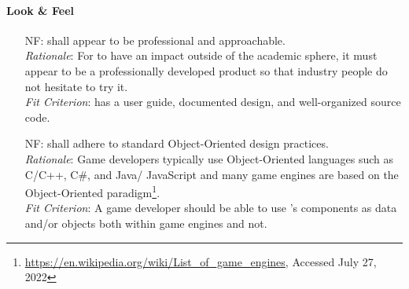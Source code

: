 \paragraph{Look \& Feel}
\noindent \begin{itemize}[wide=0pt, leftmargin=*]

    \item[NF\refstepcounter{nfnum}\thenfnum \label{N_Professional}:]
    \progname{} shall appear to be professional and approachable.
    \vspace*{1mm}\\
    \textit{Rationale}: For \progname{} to have an impact outside of the
    academic sphere, it must appear to be a professionally developed product so
    that industry people do not hesitate to try it. \vspace*{1mm}\\
    \textit{Fit Criterion}: \progname{} has a user guide, documented design,
    and well-organized source code.

    \item[NF\refstepcounter{nfnum}\thenfnum \label{N_OOStandard}:]  \progname{}
    shall adhere to standard Object-Oriented design practices. \vspace*{1mm}\\
    \textit{Rationale}: Game developers typically use Object-Oriented languages
    such as C/C++, C\#, and Java/ JavaScript \citep{sweeney2006next} and many
    game engines are based on the Object-Oriented
    paradigm\footnote{\url{https://en.wikipedia.org/wiki/List_of_game_engines},
        Accessed July 27, 2022}. \vspace*{1mm}\\
    \textit{Fit Criterion}: A game developer should be able to use \progname{}'s
    components as data and/or objects both within game engines and not.

\end{itemize}

\clearpage
